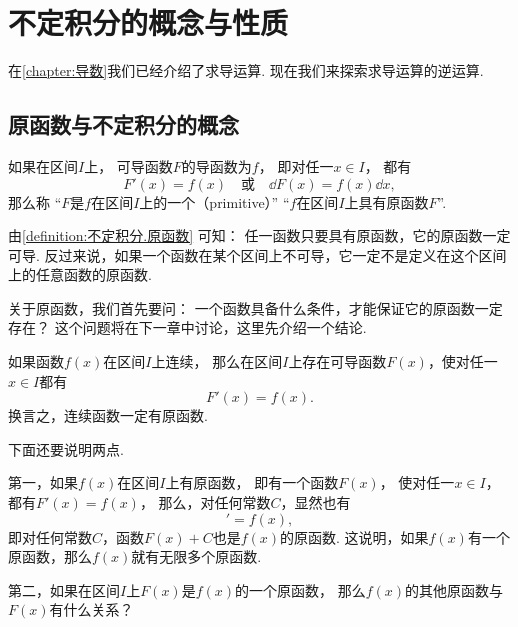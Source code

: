 \section{不定积分的概念与性质}
在\cref{chapter:导数}我们已经介绍了求导运算.
现在我们来探索求导运算的逆运算.

\subsection{原函数与不定积分的概念}
\begin{definition}\label{definition:不定积分.原函数}
如果在区间\(I\)上，
可导函数\(F\)的导函数为\(f\)，
即对任一\(x \in I\)，
都有\begin{equation*}
	F'(x)=f(x)
	\quad\text{或}\quad
	\dd{F(x)}=f(x) \dd{x},
\end{equation*}
那么称
“\(F\)是\(f\)在区间\(I\)上的一个（primitive）”
“\(f\)在区间\(I\)上具有原函数\(F\)”.
\end{definition}
\begin{remark}
由\cref{definition:不定积分.原函数} 可知：
任一函数只要具有原函数，它的原函数一定可导.
反过来说，如果一个函数在某个区间上不可导，它一定不是定义在这个区间上的任意函数的原函数.
\end{remark}

关于原函数，我们首先要问：
一个函数具备什么条件，才能保证它的原函数一定存在？
这个问题将在下一章中讨论，这里先介绍一个结论.
\begin{theorem}[原函数存在定理]%
如果函数\(f(x)\)在区间\(I\)上连续，
那么在区间\(I\)上存在可导函数\(F(x)\)，使对任一\(x \in I\)都有\begin{equation*}
	F'(x)=f(x).
\end{equation*}
换言之，连续函数一定有原函数.
\end{theorem}
下面还要说明两点.

第一，如果\(f(x)\)在区间\(I\)上有原函数，
即有一个函数\(F(x)\)，
使对任一\(x \in I\)，
都有\(F'(x) = f(x)\)，
那么，对任何常数\(C\)，显然也有\begin{equation*}
	[F(x) + C]' = f(x),
\end{equation*}
即对任何常数\(C\)，函数\(F(x) + C\)也是\(f(x)\)的原函数.
这说明，如果\(f(x)\)有一个原函数，那么\(f(x)\)就有无限多个原函数.

第二，如果在区间\(I\)上\(F(x)\)是\(f(x)\)的一个原函数，
那么\(f(x)\)的其他原函数与\(F(x)\)有什么关系？

